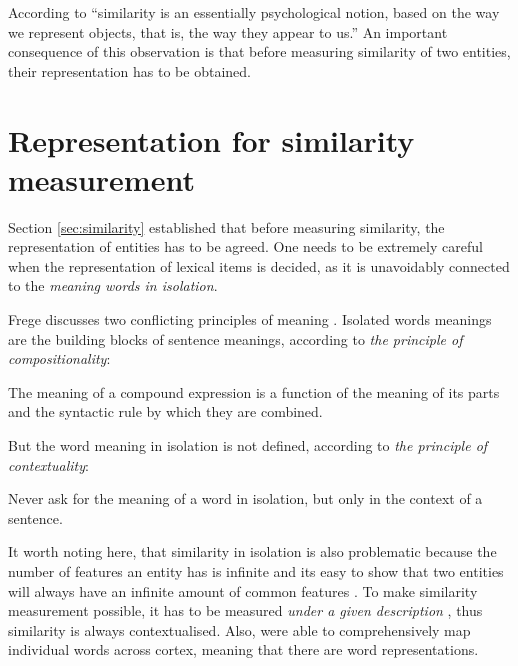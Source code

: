 According to  ``similarity is an essentially psychological notion, based on the way we represent objects, that is, the way they appear to us.'' An important consequence of this observation is that before measuring similarity of two
%
entities,\footnotemark{} their representation has to be obtained.



\section{Representation for similarity measurement}
\label{sec:word-meaning}

Section \ref{sec:similarity} established that before measuring similarity, the representation of entities has to be agreed. One needs to be extremely careful when the representation of lexical items is decided, as it is unavoidably connected to the \emph{meaning words in isolation}.


Frege discusses two conflicting principles of meaning \cite{Janssen2001}. Isolated words meanings are the building blocks of sentence meanings, according to \emph{the principle of compositionality}:
\begin{displayquote}
The meaning of a compound expression is a function of the meaning of its parts and the syntactic rule by which they are combined.
\end{displayquote}
But the word meaning in isolation is not defined, according to \emph{the principle of contextuality}:
\begin{displayquote}
Never ask for the meaning of a word in isolation, but only in the context of a sentence.
\end{displayquote}

It worth noting here, that similarity in isolation is also problematic because the number of features an entity has is infinite and its easy to show that two entities will always have an infinite amount of common features \cite{goodman1972problems,hahn1997concepts}. To make similarity measurement possible, it has to be measured \emph{under a given description} \cite{WCS:WCS1282,medin1993respects,Markman1996}, thus similarity is always contextualised. Also,  were able to comprehensively map individual words across cortex, meaning that there are word representations.

